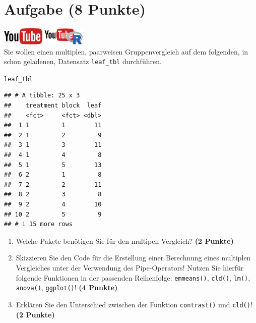 \documentclass[a4paper, 10pt]{scrartcl}\usepackage[]{graphicx}\usepackage[]{xcolor}
\makeatletter
\newcommand{\hlstd}[1]{\textcolor[rgb]{0.345,0.345,0.345}{#1}}%
\newenvironment{kframe}{%
 \def\at@end@of@kframe{}%
 \ifinner\ifhmode%
  \def\at@end@of@kframe{\end{minipage}}%
  \begin{minipage}{\columnwidth}%
 \fi\fi%
 \def\FrameCommand##1{\hskip\@totalleftmargin \hskip-\fboxsep
 \colorbox{shadecolor}{##1}\hskip-\fboxsep
     \hskip-\linewidth \hskip-\@totalleftmargin \hskip\columnwidth}%
 \MakeFramed {\advance\hsize-\width
   \@totalleftmargin\z@ \linewidth\hsize
   \@setminipage}}%
 {\par\unskip\endMakeFramed%
 \at@end@of@kframe}
\newenvironment{knitrout}{}{} %
\makeatother
\begin{document}
 
\clearpage

\section{Aufgabe \hfill (8 Punkte)}

\hfill\href{https://youtu.be/f5fHm_jCHe4}{\includegraphics[width =
  2cm]{img/youtube}}
\hspace{2Ex}
\href{https://youtu.be/_EGebjrOCUQ}{\includegraphics[width =
  2cm]{img/youtube_R}}\\[1Ex]


Sie wollen einen multiplen, paarweisen Gruppenvergleich auf dem folgenden, in \Rlogo schon geladenen, Datensatz \texttt{leaf\_tbl} durchf{\"u}hren.



\begin{knitrout}
\color{fgcolor}\begin{kframe}
\begin{alltt}
\hlstd{leaf_tbl}
\end{alltt}
\begin{verbatim}
## # A tibble: 25 x 3
##    treatment block  leaf
##    <fct>     <fct> <dbl>
##  1 1         1        11
##  2 1         2         9
##  3 1         3        11
##  4 1         4         8
##  5 1         5        13
##  6 2         1         8
##  7 2         2        11
##  8 2         3         8
##  9 2         4        10
## 10 2         5         9
## # i 15 more rows
\end{verbatim}
\end{kframe}
\end{knitrout}

\begin{enumerate}
\item Welche \Rlogo Pakete ben{\"o}tigen Sie f{\"u}r den multipen Vergleich?
  \textbf{(2 Punkte)} 
\item Skizzieren Sie den \Rlogo Code f{\"u}r die Erstellung einer
  Berechnung eines multiplen Vergleiches unter der Verwendung des
  Pipe-Operators! Nutzen Sie hierf{\"u}r folgende Funktionen in der passenden
  Reihenfolge: \texttt{emmeans()},  \texttt{cld()},
  \texttt{lm()},  \texttt{anova()},  \texttt{ggplot()}!  \textbf{(4 Punkte)}
\item Erkl{\"a}ren Sie den Unterschied zwischen der Funktion
  \texttt{contrast()} und \texttt{cld()}!
  \textbf{(2 Punkte)}
\end{enumerate}
\end{document}
